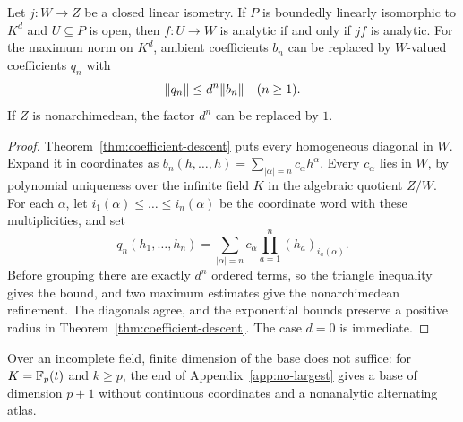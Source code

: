 \begin{theorem}\label{thm:finite-parameters}
Let $j\colon W\to Z$ be a closed linear isometry. If $P$ is boundedly linearly isomorphic to $K^d$ and $U\subseteq P$ is open, then $f\colon U\to W$ is analytic if and only if $jf$ is analytic. For the maximum norm on $K^d$, ambient coefficients $b_n$ can be replaced by $W$-valued coefficients $q_n$ with
\[
 \lVert q_n\rVert\le d^n\lVert b_n\rVert\quad(n\ge1).
\]
If $Z$ is nonarchimedean, the factor $d^n$ can be replaced by $1$.
\end{theorem}
\begin{proof}
Theorem~\ref{thm:coefficient-descent} puts every homogeneous diagonal in $W$. Expand it in coordinates as
$b_n(h,\ldots,h)=\sum_{|\alpha|=n}c_\alpha h^\alpha$. Every $c_\alpha$ lies in $W$, by polynomial uniqueness over the
infinite field $K$ in the algebraic quotient $Z/W$. For each $\alpha$, let $i_1(\alpha)\le\dots\le i_n(\alpha)$ be the coordinate word with
these multiplicities, and set
\[
 q_n(h_1,\ldots,h_n)
 =\sum_{|\alpha|=n}c_\alpha\prod_{a=1}^n(h_a)_{i_a(\alpha)}.
\]
Before grouping there are exactly $d^n$ ordered terms, so the triangle inequality gives the bound, and two maximum
estimates give the nonarchimedean refinement. The diagonals agree, and the exponential bounds preserve a positive radius
in Theorem~\ref{thm:coefficient-descent}. The case $d=0$ is immediate.
\end{proof}

Over an incomplete field, finite dimension of the base does not suffice: for $K=\mathbb F_p(t)$ and $k\ge p$, the end of
Appendix~\ref{app:no-largest} gives a base of dimension $p+1$ without continuous coordinates and a nonanalytic alternating atlas.

